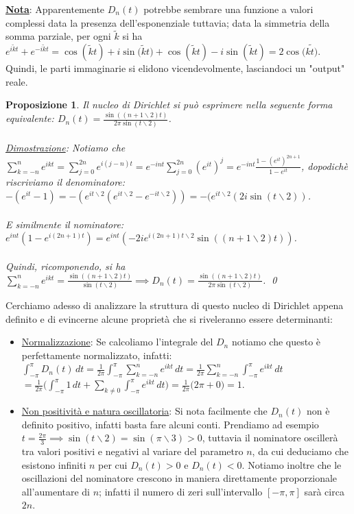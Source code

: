 \documentclass[a4paper,12pt]{report}
\newtheorem{proposizione}{Proposizione}[chapter]
\newcommand{\lt}{<}
\newcommand{\gt}{>}
\begin{document}
\underline{\textbf{Nota}}: Apparentemente $D_n(t)$ potrebbe sembrare una funzione a valori complessi data la presenza dell'esponenziale tuttavia; data la simmetria della somma parziale, per ogni $\tilde{k}$ si ha $e^{i\tilde{k}t}+e^{-i\tilde{k}t}=\cos(\tilde{k}t)+i\sin{(\tilde{k}t})+\cos(\tilde{k}t)-i\sin({\tilde{k}t})=2\cos(\tilde{kt)}$. Quindi, le parti immaginarie si elidono vicendevolmente, lasciandoci un "output" reale.

\begin{proposizione}
    Il nucleo di Dirichlet si può esprimere nella seguente forma equivalente: $D_n(t)=\displaystyle\frac{\sin((n+1\backslash2)t)}{2\pi\sin( t\backslash2)}$.
    \\
    \\ \underline{Dimostrazione}: Notiamo che $\displaystyle\sum_{k=-n}^ne^{ikt}=\sum_{j=0}^{2n}e^{i(j-n)t}=e^{-int}\sum_{j=0}^{2n}(e^{it})^j=e^{-int}\frac{1-(e^{it})^{2n+1}}{1-e^{it}}$, dopodichè riscriviamo il denominatore: $-(e^{it}-1)=-(e^{it\backslash2}(e^{it\backslash2}-e^{-it\backslash2}))=-(e^{it\backslash2}(2i\sin(t\backslash2))$.
    \\ 
    \\E similmente il nominatore: $e^{int}(1-e^{i(2n+1)t})=e^{int}(-2ie^{i(2n+1)t\backslash2}\sin((n+1\backslash2)t))$.
    \\
    \\ Quindi, ricomponendo, si ha $\displaystyle\sum_{k=-n}^ne^{ikt}=\frac{\sin((n+1\backslash2)t)}{\sin( t\backslash2)}\implies D_n(t)=\frac{\sin((n+1\backslash2)t)}{2\pi\sin( t\backslash2)}$. \qed
\end{proposizione}

\newpage

Cerchiamo adesso di analizzare la struttura di questo nucleo di Dirichlet appena definito e di evincerne alcune proprietà che si riveleranno essere determinanti:

\begin{itemize}
    \item \underline{Normalizzazione}: Se calcoliamo l'integrale del $D_n$ notiamo che questo è perfettamente normalizzato, infatti: $\displaystyle\int_{-\pi}^\pi D_n(t)\,dt=\frac{1}{2\pi}\int_{-\pi}^\pi \sum_{k=-n}^n e^{ikt} \,dt=\frac{1}{2\pi}\sum_{k=-n}^n\int_{-\pi}^\pi e^{ikt}\,dt$
    \\ $=\displaystyle\frac{1}{2\pi}\bigg(\int_{-\pi}^\pi1 \,dt+\sum_{k\neq 0}\int_{-\pi}^\pi e^{ikt}\,dt\bigg)=\frac{1}{2\pi}\bigg(2\pi+0\bigg)=1$.
    \\
    \item\underline{Non positività e natura oscillatoria}: Si nota facilmente che $D_n(t)$ non è definito positivo, infatti basta fare alcuni conti. Prendiamo ad esempio $t=\frac{2\pi}{3}\implies \sin(t\backslash2)=\sin(\pi\backslash3)\gt 0$, tuttavia il nominatore oscillerà tra valori positivi e negativi al variare del parametro $n$, da cui deduciamo che esistono infiniti $n$ per cui $D_n(t)\gt 0$ e $D_n(t)\lt 0$. Notiamo inoltre che le oscillazioni del nominatore crescono in maniera direttamente proporzionale all'aumentare di $n$; infatti il numero di zeri sull'intervallo $[-\pi,\pi]$ sarà circa $2n$.
\end{itemize}
\end{document}
